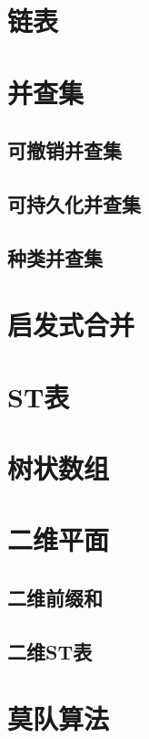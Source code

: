 \documentclass{probook}
\begin{document}
\section{链表}
 
\section{并查集} 
\subsection{可撤销并查集} 

\subsection{可持久化并查集} 
 
\subsection{种类并查集}
 
\section{启发式合并}
 
\section{ST表}

\section{树状数组}

\section{二维平面} 
\subsection{二维前缀和} 

\subsection{二维ST表} 

\section{莫队算法} 
\end{document}

